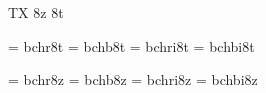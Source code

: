 
\ifx\ffdecl\undefined  \fi

\ffdecl [Charter] {\rm \bf \it \bi} {} {} {TX} {8z 8t}

\ismacro{}\ifttrue

   \font\tenrm = bchr8t
   \font\tenbf = bchb8t
   \font\tenit = bchri8t
   \font\tenbi = bchbi8t

\fi

\ismacro{}\ifttrue

   \font\tenrm = bchr8z
   \font\tenbf = bchb8z
   \font\tenit = bchri8z
   \font\tenbi = bchbi8z
   

\fi

\tenrm

\ifx\loadmathfonts\relax \endinput \fi
\ifx\mathpreloaded X\else  \fi                     

